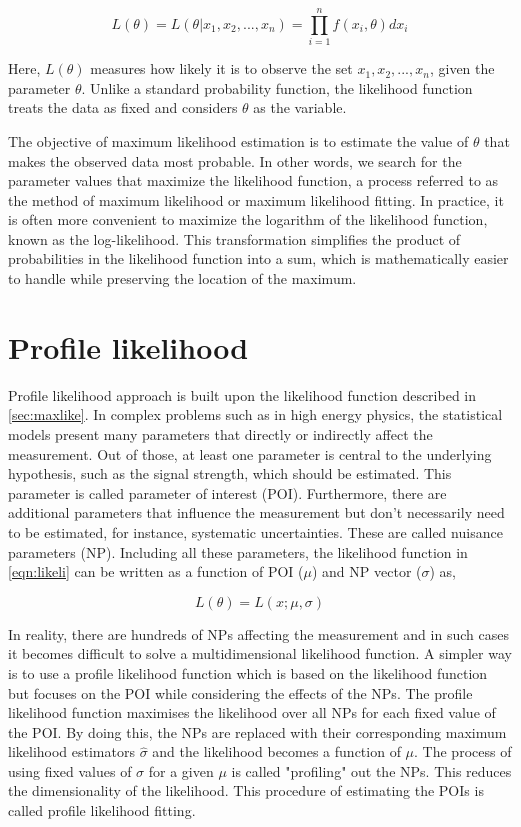 \begin{equation}
    L (\theta) = L(\theta | x_1,x_2,...,x_n) = \prod_{i=1}^{n} f (x_i,\theta)dx_i
    \label{eqn:likeli}
\end{equation}


Here, $L(\theta)$ measures how likely it is to observe the set ${x_1,x_2,...,x_n}$, given the 
parameter $\theta$. Unlike a standard probability function, the likelihood function treats the 
data as fixed and considers $\theta$ as the variable.

The objective of maximum likelihood estimation is to estimate the value of 
$\theta$ that makes the observed data most probable. In other words, we search for the parameter 
values that maximize the likelihood function, a process referred to as the method of maximum 
likelihood or maximum likelihood fitting. In practice, it is often more convenient to maximize the 
logarithm of the likelihood function, known as the log-likelihood. This transformation simplifies the 
product of probabilities in the likelihood function into a sum, which is mathematically easier to 
handle while preserving the location of the maximum.

\section{Profile likelihood}

Profile likelihood approach is built upon the likelihood function described in \cref{sec:maxlike}.
In complex problems such as in high energy physics, the statistical models present many parameters
that directly or indirectly affect the measurement. Out of those, at least one parameter is central to the 
underlying hypothesis, such as the signal strength, which should be estimated. This parameter is called parameter of interest (POI).
Furthermore, there are additional parameters that influence the measurement but don't necessarily
need to be estimated, for instance, systematic uncertainties. These are called nuisance 
parameters (NP). Including all these parameters,
the likelihood function in \cref{eqn:likeli} can be written as a function of 
POI ($\mu$) and NP vector ($\sigma$) as,

\begin{equation}
    L (\theta) = L(x;\mu,\sigma)
\end{equation}

In reality, there are hundreds of NPs affecting the measurement and in such cases it becomes difficult to
solve a multidimensional likelihood function. A simpler way is to use a profile likelihood function
which is based on the likelihood function but focuses on the POI while considering the effects of
the NPs. The profile likelihood function maximises the likelihood over all NPs for each fixed value 
of the POI. By doing this, the NPs are replaced with their corresponding maximum likelihood
estimators $\hat{\sigma}$ and the likelihood becomes a function of $\mu$. The process of 
using fixed values of $\sigma$ for a given $\mu$ is called "profiling" out the NPs. This reduces 
the dimensionality of the likelihood. This procedure of estimating the POIs is called profile likelihood fitting.

